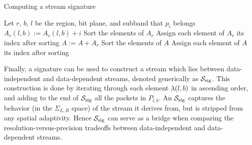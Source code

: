 \begin{algorithm}[h]
  \caption{Computing a stream signature}
  \begin{algorithmic}[1]
			\State Let $r$, $b$, $l$ be the region, bit plane, and subband that $p_i$ belongs
			\State $A_r(l,b) := A_r(l,b)+i$
		\EndFor
			\State Sort the elements of $A_r$
			\State Assign each element of $A_r$ its index after sorting
			\State $A := A+A_r$
		\EndFor
		\State Sort the elements of $A$
		\State Assign each element of $A$ its index after sorting
	\end{algorithmic}
	\label{alg:signature}
\end{algorithm}

Finally, a signature can be used to construct a stream which lies between data-independent and
data-dependent streams, denoted generically as $\ssig$. This construction is done by iterating
through each element $\sgn(l,b)$ in ascending order, and adding to the end of $\ssig$ all the
packets in $P_{l,b}$. An $\ssig$ captures the behavior (in the $\Sigma_{L,B}$ space) of the stream
it derives from, but is stripped from any spatial adaptivity. Hence $\ssig$ can serve as a bridge
when comparing the resolution-versus-precision tradeoffs between data-independent and data-dependent
streams.




